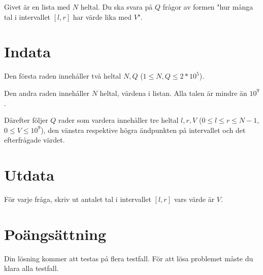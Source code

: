 Givet är en lista med $N$ heltal. Du ska svara på $Q$ frågor av formen "hur många tal
i intervallet $[l,r]$ har värde lika med $V$".

\section*{Indata}
Den första raden innehåller två heltal $N,Q$ ($1 \leq N,Q \leq 2*10^5$).

Den andra raden innehåller $N$ heltal, värdena i listan. Alla talen är mindre än $10^9$.

Därefter följer $Q$ rader som vardera innehåller tre heltal $l, r, V$ ($0 \leq l \leq r \leq N-1$, $0 \leq V \leq 10^9$),
den vänstra respektive högra ändpunkten på intervallet och det efterfrågade värdet.

\section*{Utdata}
För varje fråga, skriv ut antalet tal i intervallet $[l,r]$ vars värde är $V$.

\section*{Poängsättning}
Din lösning kommer att testas på flera testfall.
\noindent
För att lösa problemet måste du klara alla testfall.
